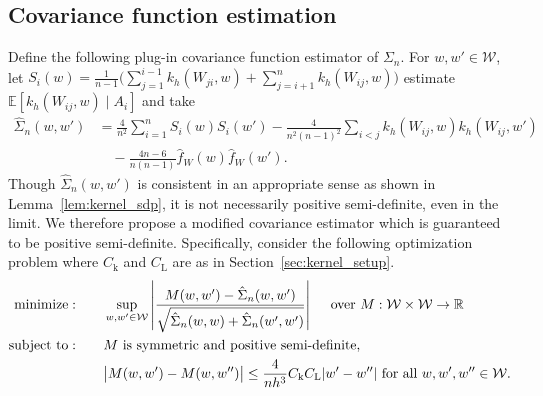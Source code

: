 \documentclass[11pt,lof]{puthesis}
\newcommand{\R}{\ensuremath{\mathbb{R}}}
\newcommand{\E}{\ensuremath{\mathbb{E}}}
\newcommand{\rL}{\ensuremath{\mathrm{L}}}
\newcommand{\rk}{\ensuremath{\mathrm{k}}}
\newcommand{\cW}{\ensuremath{\mathcal{W}}}
\DeclareMathOperator*{\minimize}{minimize:}
\DeclareMathOperator*{\subjectto}{subject\ to:}
\theoremstyle{break}
\theoremstyle{proof}
\begin{document}
\subsection{Covariance function estimation}
\label{sec:kernel_covariance_estimation}

Define the following plug-in covariance function
estimator of $\Sigma_n$. For $w, w' \in \cW$,
let $S_i(w) = \frac{1}{n-1} \big( \sum_{j = 1}^{i-1} k_h(W_{j i}, w)
+ \sum_{j = i+1}^n k_h(W_{i j}, w) \big)$
estimate $\E[k_h(W_{i j},w) \mid A_i]$ and take
%
\begin{align*}
  \hat \Sigma_n(w,w')
  &= \frac{4}{n^2} \sum_{i=1}^n S_i(w) S_i(w')
  - \frac{4}{n^2(n-1)^2} \sum_{i<j} k_h(W_{i j},w) k_h(W_{i j},w') \\
  &\quad- \frac{4n-6}{n(n-1)} \hat f_W(w) \hat f_W(w').
\end{align*}
%
Though $\hat\Sigma_n(w,w')$ is consistent in an appropriate sense as shown in
Lemma~\ref{lem:kernel_sdp}, it is not necessarily positive semi-definite, even
in the limit. We therefore propose a modified covariance estimator which is
guaranteed to be positive semi-definite. Specifically, consider the following
optimization problem where $C_\rk$ and $C_\rL$ are as in
Section~\ref{sec:kernel_setup}.
%
\begin{equation}
  \label{eq:kernel_sdp}
  \begin{aligned}
    \minimize
    \qquad
    & \sup_{w,w' \in \cW}
    \left|
    \frac{M(w,w') - \hat\Sigma_n(w,w')}
    {\sqrt{\hat \Sigma_n(w,w) + \hat \Sigma_n(w',w')}}
    \right|
    \quad \textup{ over } M: \cW \times \cW \to \R
    \\
    \subjectto
    \qquad
    & M \textup{ is symmetric and positive semi-definite}, \\
    & \big|M(w,w') - M(w, w'')\big|
    \leq \frac{4}{n h^3}
    C_\rk C_\rL
    |w'-w''|
    \textup{ for all }
    w, w', w'' \in \cW.
  \end{aligned}
\end{equation}
\end{document}
